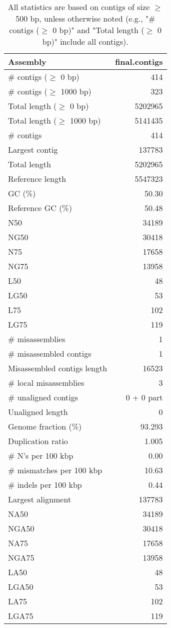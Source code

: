 \documentclass[12pt,a4paper]{article}
\begin{document}
\begin{table}[ht]
\begin{center}
\caption{All statistics are based on contigs of size $\geq$ 500 bp, unless otherwise noted (e.g., "\# contigs ($\geq$ 0 bp)" and "Total length ($\geq$ 0 bp)" include all contigs).}
\begin{tabular}{|l*{1}{|r}|}
\hline
Assembly & final.contigs \\ \hline
\# contigs ($\geq$ 0 bp) & 414 \\ \hline
\# contigs ($\geq$ 1000 bp) & 323 \\ \hline
Total length ($\geq$ 0 bp) & 5202965 \\ \hline
Total length ($\geq$ 1000 bp) & 5141435 \\ \hline
\# contigs & 414 \\ \hline
Largest contig & 137783 \\ \hline
Total length & 5202965 \\ \hline
Reference length & 5547323 \\ \hline
GC (\%) & 50.30 \\ \hline
Reference GC (\%) & 50.48 \\ \hline
N50 & 34189 \\ \hline
NG50 & 30418 \\ \hline
N75 & 17658 \\ \hline
NG75 & 13958 \\ \hline
L50 & 48 \\ \hline
LG50 & 53 \\ \hline
L75 & 102 \\ \hline
LG75 & 119 \\ \hline
\# misassemblies & 1 \\ \hline
\# misassembled contigs & 1 \\ \hline
Misassembled contigs length & 16523 \\ \hline
\# local misassemblies & 3 \\ \hline
\# unaligned contigs & 0 + 0 part \\ \hline
Unaligned length & 0 \\ \hline
Genome fraction (\%) & 93.293 \\ \hline
Duplication ratio & 1.005 \\ \hline
\# N's per 100 kbp & 0.00 \\ \hline
\# mismatches per 100 kbp & 10.63 \\ \hline
\# indels per 100 kbp & 0.44 \\ \hline
Largest alignment & 137783 \\ \hline
NA50 & 34189 \\ \hline
NGA50 & 30418 \\ \hline
NA75 & 17658 \\ \hline
NGA75 & 13958 \\ \hline
LA50 & 48 \\ \hline
LGA50 & 53 \\ \hline
LA75 & 102 \\ \hline
LGA75 & 119 \\ \hline
\end{tabular}
\end{center}
\end{table}
\end{document}
